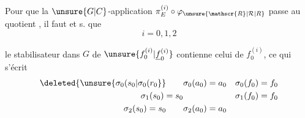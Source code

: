 Pour que la  $\unsure{G|C}$-application  $\pi_E^{(i)}\circ\varphi_{\unsure{\mathscr{R}|\mathcal{R}|R}}$ passe au quotient , il faut et s. que
\[i=0,1,2\]

 le stabilisateur dans $G$ de $\unsure{f_0^{(i)}|\underline{f}_0^{(i)}}$ contienne celui de $f_0^{(i)}$, ce qui s'écrit
\[
\begin{aligned}
\deleted{\unsure{\sigma_0(s_0|\sigma_0(r_0}}\qquad
&\sigma_0(a_0)=a_0 &&\sigma_0(f_0)=f_0\\
\sigma_1(s_0)=s_0
&&&\sigma_1(f_0)=f_0\\
\sigma_2(s_0)=s_0\qquad
&\sigma_2(a_0)=a_0
\end{aligned}
\]
